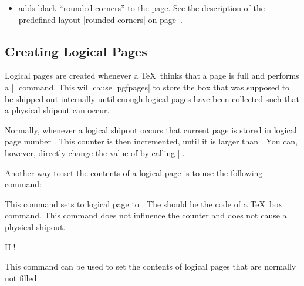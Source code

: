 \begin{command}{\pgfpageslogicalpageoptions{}}
\begin{itemize}
    You can also call |\pgfdiscardpath| and add your own path
    construction code (for example to paint a rectangle with rounded
    corners). The coordinate system is  setup in such a way that a
    rectangle starting at the origin and having the height and width
    of \TeX-box 0 will result in a rectangle filling exactly the
    logical page currently being put on the physical page. The logical
    page is inserted \emph{after} these commands have been executed.

    \example Add a rectangle around the page:
\begin{codeexample}
\end{codeexample}
  \item
    adds black ``rounded corners'' to the page. See the description of
    the predefined layout |rounded corners| on
    page~\pageref{layout-rounded-corners}. 
  \end{itemize}
\end{command}




\subsection{Creating Logical Pages}

Logical pages are created whenever a \TeX\ thinks that a page is full
and performs a |\shipout| command. This will cause |pgfpages| to store
the box that was supposed to be shipped out internally until enough
logical pages have been collected such that a physical shipout can
occur.

Normally, whenever a logical shipout occurs that current page is
stored in logical page number . This
counter is then incremented, until it is larger than . You can, however, directly change the value of
 by calling |\pgfpagesphysicalpageoptions|.

Another way to set the contents of a logical page is to use the
following command:

\begin{command}{\pgfpagesshipoutlogicalpage{}}
  This command sets to logical page  to . The
   should be the code of a \TeX\ box command. This command
  does not influence the counter  and does
  not cause a physical shipout.

\begin{codeexample}
\vbox{Hi!}
\end{codeexample}

  This command can be used to set the contents of logical pages that
  are normally not filled.
\end{command}

